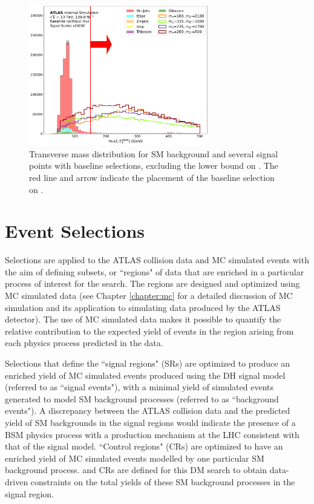 \begin{figure}[H]
	\centering
	\includegraphics[width=0.7\textwidth]{Figures/5/mT_lep_met_N_1.pdf}
	\caption[]{Transverse mass distribution for SM background and several signal points with baseline selections, excluding the lower bound on \mtlepmet. The red line and arrow indicate the placement of the baseline selection on \mtlepmet.}
	\label{fig:mT_lep_met}
\end{figure}

\section{Event Selections}
\label{sec:evt_selections}

Selections are applied to the ATLAS collision data and MC simulated events with the aim of defining subsets, or ``regions" of data that are enriched in a particular process of interest for the search. The regions are designed and optimized using MC simulated data (see Chapter \ref{chapter:mc} for a detailed discussion of MC simulation and its application to simulating data produced by the ATLAS detector). The use of MC simulated data makes it possible to quantify the relative contribution to the expected yield of events in the region arising from each physics process predicted in the data.

Selections that define the ``signal regions" (SRs) are optimized to produce an enriched yield of MC simulated events produced using the DH signal model (referred to as ``signal events"), with a minimal yield of simulated events generated to model SM background processes (referred to as ``background events"). A discrepancy between the ATLAS collision data and the predicted yield of SM backgrounds in the signal regions would indicate the presence of a BSM physics process with a production mechanism at the LHC consistent with that of the signal model. ``Control regions" (CRs) are optimized to have an enriched yield of MC simulated events modelled by one particular SM background process. \wjets and \ttbar CRs are defined for this DM search to obtain data-driven constraints on the total yields of these SM background processes in the signal region. 

